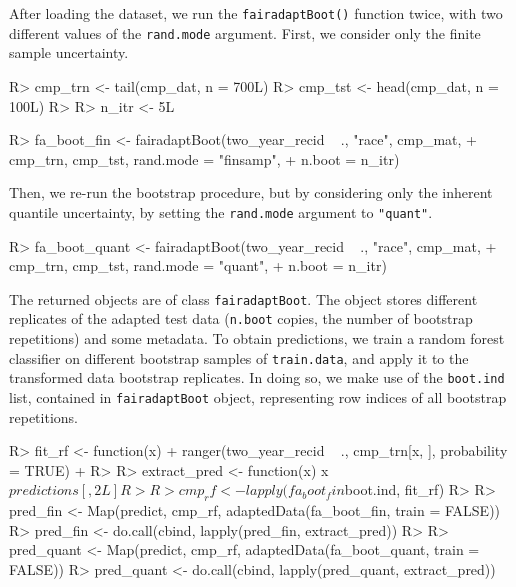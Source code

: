 \documentclass[
  nojss]{jss}
\begin{document}
After loading the dataset, we run the \texttt{fairadaptBoot()} function
twice, with two different values of the \texttt{rand.mode} argument.
First, we consider only the finite sample uncertainty.

\begin{CodeChunk}
\begin{CodeInput}
R> cmp_trn <- tail(cmp_dat, n = 700L)
R> cmp_tst <- head(cmp_dat, n = 100L)
R> 
R> n_itr <- 5L
\end{CodeInput}
\end{CodeChunk}

\begin{CodeChunk}
\begin{CodeInput}
R> fa_boot_fin <- fairadaptBoot(two_year_recid ~ ., "race", cmp_mat,
+                              cmp_trn, cmp_tst, rand.mode = "finsamp",
+                              n.boot = n_itr)
\end{CodeInput}
\end{CodeChunk}

Then, we re-run the bootstrap procedure, but by considering only the
inherent quantile uncertainty, by setting the \texttt{rand.mode}
argument to \texttt{"quant"}.

\begin{CodeChunk}
\begin{CodeInput}
R> fa_boot_quant <- fairadaptBoot(two_year_recid ~ ., "race", cmp_mat,
+                                cmp_trn, cmp_tst, rand.mode = "quant",
+                                n.boot = n_itr)
\end{CodeInput}
\end{CodeChunk}

The returned objects are of class \texttt{fairadaptBoot}. The object
stores different replicates of the adapted test data (\texttt{n.boot}
copies, the number of bootstrap repetitions) and some metadata. To
obtain predictions, we train a random forest classifier on different
bootstrap samples of \texttt{train.data}, and apply it to the
transformed data bootstrap replicates. In doing so, we make use of the
\texttt{boot.ind} list, contained in \texttt{fairadaptBoot} object,
representing row indices of all bootstrap repetitions.

\begin{CodeChunk}
\begin{CodeInput}
R> fit_rf <- function(x) {
+   ranger(two_year_recid ~ ., cmp_trn[x, ], probability = TRUE)
+ }
R> 
R> extract_pred <- function(x) x$predictions[, 2L]
R> 
R> cmp_rf <- lapply(fa_boot_fin$boot.ind, fit_rf)
R> 
R> pred_fin <- Map(predict, cmp_rf, adaptedData(fa_boot_fin, train = FALSE)) 
R> pred_fin <- do.call(cbind, lapply(pred_fin, extract_pred))
R> 
R> pred_quant <- Map(predict, cmp_rf, adaptedData(fa_boot_quant, train = FALSE))
R> pred_quant <- do.call(cbind, lapply(pred_quant, extract_pred))
\end{CodeInput}
\end{CodeChunk}
\end{document}
